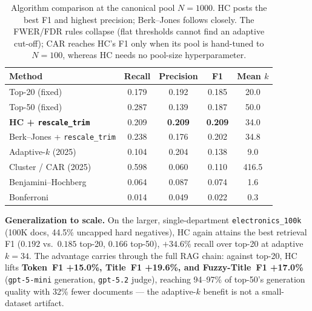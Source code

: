 \documentclass[11pt]{article}
\begin{document}
\begin{table}[H]
\centering
\begin{tabular}{lcccc}
\toprule
\textbf{Method} & \textbf{Recall} & \textbf{Precision} & \textbf{F1} & \textbf{Mean $k$} \\
\midrule
Top-20 (fixed)                       & 0.179 & 0.192 & 0.185 & 20.0 \\
Top-50 (fixed)                       & 0.287 & 0.139 & 0.187 & 50.0 \\
\midrule
\textbf{HC + \texttt{rescale\_trim}} & 0.209 & \textbf{0.209} & \textbf{0.209} & 34.0 \\
Berk--Jones + \texttt{rescale\_trim} & 0.238 & 0.176 & 0.202 & 34.8 \\
Adaptive-$k$ (2025)                  & 0.104 & 0.204 & 0.138 & 9.0 \\
Cluster / CAR (2025)                 & 0.598 & 0.060 & 0.110 & 416.5 \\
Benjamini--Hochberg                  & 0.064 & 0.087 & 0.074 & 1.6 \\
Bonferroni                           & 0.014 & 0.049 & 0.022 & 0.3 \\
\bottomrule
\end{tabular}
\caption{Algorithm comparison at the canonical pool $N\!=\!1000$. HC posts the
best F1 and highest precision; Berk--Jones follows closely. The FWER/FDR rules
collapse (flat thresholds cannot find an adaptive cut-off); CAR reaches HC's F1
only when its pool is hand-tuned to $N\!=\!100$, whereas HC needs no pool-size
hyperparameter.}
\end{table}

\textbf{Generalization to scale.} On the larger, single-department
\texttt{electronics\_100k} (100K docs, 44.5\% uncapped hard negatives), HC again
attains the best retrieval F1 ($0.192$ vs.\ $0.185$ top-20, $0.166$ top-50),
$+34.6\%$ recall over top-20 at adaptive $k\!=\!34$. The advantage carries
through the full RAG chain: against top-20, HC lifts \textbf{Token~F1 +15.0\%,
Title~F1 +19.6\%, and Fuzzy-Title~F1 +17.0\%} (\texttt{gpt-5-mini} generation,
\texttt{gpt-5.2} judge), reaching 94--97\% of top-50's generation quality with
32\% fewer documents --- the adaptive-$k$ benefit is not a small-dataset artifact.
\end{document}

